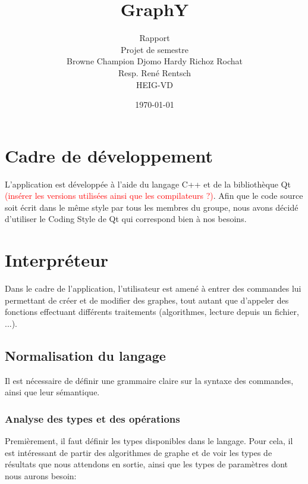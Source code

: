\documentclass[french]{article}
\begin{document}
	
	\title{GraphY} %
	\author{Rapport\\ 
		Projet de semestre\\
		Browne Champion Djomo Hardy Richoz Rochat\\
		Resp. René Rentsch\\
		HEIG-VD}
	\date{\today} %
	\maketitle
	
	\tableofcontents
	
	\listoffigures
	
	\justify
	\normalsize
	
	\section{Cadre de développement} 
		L'application est développée à l'aide du langage C++ et de la bibliothèque Qt \textcolor{red}{(insérer les versions utilisées ainsi que les compilateurs ?)}. Afin que le code source soit écrit dans le même style par tous les membres du groupe, nous avons décidé d'utiliser le Coding Style de Qt \cite{qtStyle} qui correspond bien à nos besoins.
			
	\section{Interpréteur} %
		Dans le cadre de l'application, l'utilisateur est amené à entrer des commandes lui permettant de créer et de modifier des graphes, tout autant que d'appeler des fonctions effectuant différents traitements (algorithmes, lecture depuis un fichier, ...). 
	
		\subsection{Normalisation du langage} 
			Il est nécessaire de définir une grammaire claire sur la syntaxe des commandes, ainsi que leur sémantique.
			
			\subsubsection{Analyse des types et des opérations} 
				Premièrement, il faut définir les types disponibles dans le langage. Pour cela, il est intéressant de partir des algorithmes de graphe et de voir les types de résultats que nous attendons en sortie, ainsi que les types de paramètres dont nous aurons besoin:
			
\end{document}
